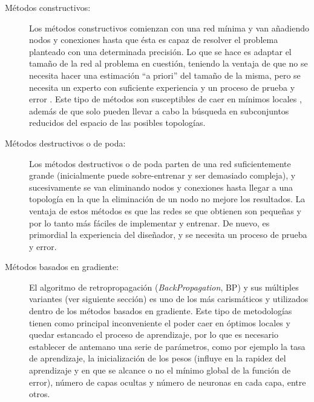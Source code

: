 \begin{description}
\item[Métodos constructivos:] Los métodos constructivos comienzan con una red mínima y
van añadiendo nodos y conexiones hasta que ésta es capaz de resolver el problema planteado
con una determinada precisión. Lo que se hace es adaptar el tamaño de la red al problema
en cuestión, teniendo la ventaja de que no se necesita hacer una estimación “a priori” del
tamaño de la misma, pero se necesita un experto con suficiente experiencia y un proceso de
prueba y error \cite{Burgess1994,Setiono1995}. Este tipo de métodos son susceptibles
de caer en mínimos locales \cite{Angeline1994}, además de que solo pueden llevar a cabo la
búsqueda en subconjuntos reducidos del espacio de las posibles
topologías.
\item[Métodos destructivos o de poda:] Los métodos destructivos o de poda
\cite{Reed1993,Reed1999} parten de una red suficientemente grande (inicialmente puede
sobre-entrenar y ser demasiado compleja), y sucesivamente se van eliminando nodos y
conexiones hasta llegar a una topología en la que la eliminación de un nodo no mejore los
resultados. La ventaja de estos métodos es que las redes se que obtienen son pequeñas y por
lo tanto más fáciles de implementar y entrenar. De nuevo, es primordial la experiencia del
diseñador, y se necesita un proceso de prueba y error.
\item[Métodos basados en gradiente:] El algoritmo de retropropagación
(\textit{BackPropagation}, BP) \cite{Chauvin1995} y sus múltiples variantes
\cite{Hush1993,Moller1993,Chauvin1995}
(ver siguiente sección) es uno de los más carismáticos y utilizados dentro de los métodos
basados en gradiente. Este tipo de metodologías tienen como principal inconveniente el
poder caer en óptimos locales y quedar estancado el proceso de aprendizaje, por lo que es
necesario establecer
de antemano una serie de parámetros, como por ejemplo la tasa de aprendizaje, la
inicialización de los pesos (influye en la rapidez del aprendizaje y en que se alcance o
no el mínimo global de la función de error), número de capas ocultas y número de neuronas
en cada capa, entre otros.
\end{description}

